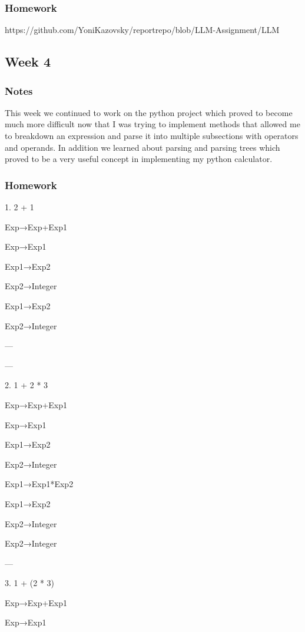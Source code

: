 \documentclass{article}
\theoremstyle{theorem}
\theoremstyle{definition}
\theoremstyle{remark}
\begin{document}
\subsubsection*{Homework}

https://github.com/YoniKazovsky/reportrepo/blob/LLM-Assignment/LLM%


\subsection{Week 4}



\subsubsection*{Notes}

This week we continued to work on the python project which proved to become much more difficult now that I was trying to implement methods that allowed me to breakdown an expression and parse it into multiple subsections with operators and operands.
In addition we learned about parsing and parsing trees which proved to be a very useful concept in implementing my python calculator.

\subsubsection*{Homework}

1. 2 + 1

Exp→Exp+Exp1

Exp→Exp1

Exp1→Exp2

Exp2→Integer

Exp1→Exp2

Exp2→Integer

---

---

2. 1 + 2 * 3

Exp→Exp+Exp1

Exp→Exp1

Exp1→Exp2

Exp2→Integer

Exp1→Exp1*Exp2

Exp1→Exp2

Exp2→Integer

Exp2→Integer

---

3. 1 + (2 * 3)

Exp→Exp+Exp1

Exp→Exp1
\end{document}
